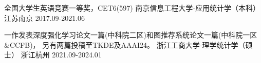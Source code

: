 \begin{educventries}
  \educventry
    {全国大学生英语竞赛一等奖，CET6(597)}
    {南京信息工程大学-应用统计学（本科）}
    {江苏南京}
    {2017.09-2021.06}

  \educventry
    {一作发表深度强化学习论文一篇(中科院二区)和图推荐系统论文一篇(中科院一区\&CCFB)，
    另有两篇投稿至TKDE及AAAI24。}
    {浙江工商大学-理学统计学（硕士）}
    {浙江杭州}
    {2021.09-2024.01}

\end{educventries}
